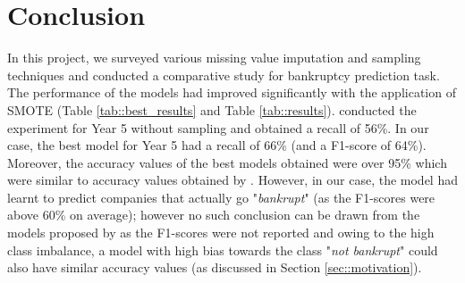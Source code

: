 \documentclass[11pt,a4paper]{article}
\begin{document}
\section{Conclusion}
In this project, we surveyed various missing value imputation and sampling techniques and conducted a comparative study for bankruptcy prediction task. The performance of the models had improved significantly with the application of SMOTE (Table  \ref{tab::best_results} and Table \ref{tab::results}).  conducted the experiment for Year 5 without sampling and obtained a recall of 56\%. In our case, the best model for Year 5 had a recall of 66\% (and a F1-score of 64\%). Moreover, the accuracy values of the best models obtained were over 95\% which were similar to accuracy values obtained by . However, in our case, the model had learnt to predict companies that actually go "\textit{bankrupt}" (as the F1-scores were above 60\% on average); however no such conclusion can be drawn from the models proposed by  as the F1-scores were not reported and owing to the high class imbalance, a model with high bias towards the class "\textit{not bankrupt}" could also have similar accuracy values (as discussed in Section \ref{sec::motivation}).










\appendix


\end{document}
